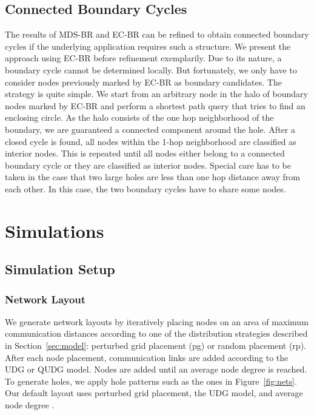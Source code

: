 \documentclass{llncs}
\begin{document}
\subsection{Connected Boundary Cycles}
The results of MDS-BR and EC-BR can be refined to obtain connected boundary cycles if the underlying application requires such a structure.
We present the approach using EC-BR before refinement exemplarily.
Due to its nature, a boundary cycle cannot be determined locally. 
But fortunately, we only have to consider nodes previously marked by EC-BR as boundary candidates.
The strategy is quite simple.
We start from an arbitrary node in the halo of boundary nodes marked by EC-BR and perform a shortest path query that tries to find an enclosing circle.
As the halo consists of the one hop neighborhood of the boundary, we are guaranteed a connected component around the hole.
After a closed cycle is found, all nodes within the 1-hop neighborhood are classified as interior nodes.
This is repeated until all nodes either belong to a connected boundary cycle or they are classified as interior nodes.
Special care has to be taken in the case that two large holes are less than one hop distance away from each other.
In this case, the two boundary cycles have to share some nodes.



\section{Simulations}\label{sec:simulations}

\subsection{Simulation Setup}

\subsubsection{Network Layout}
We generate network layouts by iteratively placing nodes on an area of  maximum communication distances according to one of the distribution strategies described in Section~\ref{sec:model}: perturbed grid placement (pg) or random placement (rp).
After each node placement, communication links are added according to the UDG or QUDG model.
Nodes are added until an average node degree  is reached.
To generate holes, we apply hole patterns such as the ones in Figure~\ref{fig:nets}.
Our default layout uses perturbed grid placement, the UDG model, and average node degree .
\end{document}
